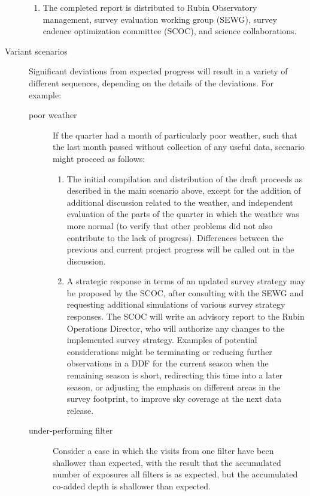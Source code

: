 \begin{description}
\begin{enumerate}
\item The completed report is distributed to Rubin Observatory management, survey evaluation working group (SEWG), survey cadence optimization committee (SCOC), and science collaborations.
\end{enumerate}
\item[{Variant scenarios}] Significant deviations from expected progress will result in a variety of different sequences, depending on the details of the deviations. For example:
\begin{description}
\item[{poor weather}] If the quarter had a month of particularly poor weather, such that the last month passed without collection of any useful data, scenario might proceed as follows:
\begin{enumerate}
\item The initial compilation and distribution of the draft proceeds as described in the main scenario above, except for the addition of additional discussion related to the weather, and independent evaluation of the parts of the quarter in which the weather was more normal (to verify that other problems did not also contribute to the lack of progress). Differences between the previous and current project progress will be called out in the discussion.
\item A strategic response in terms of an updated survey strategy may be proposed by the SCOC, after consulting with the SEWG and requesting additional simulations of various survey strategy responses. The SCOC will write an advisory report to the Rubin Operations Director, who will authorize any changes to the implemented survey strategy.  Examples of potential considerations might be terminating or reducing further observations in a DDF for the current season when the remaining season is short, redirecting this time into a later season, or adjusting the emphasis on different areas in the survey footprint, to improve sky coverage at the next data release. 
\end{enumerate}
\item[{under-performing filter}] Consider a case in which the visits from one filter have been shallower than expected, with the result that the accumulated number of exposures all filters is as expected, but the accumulated co-added depth is shallower than expected.
\begin{enumerate}

\end{enumerate}
\end{description}
\end{description}
